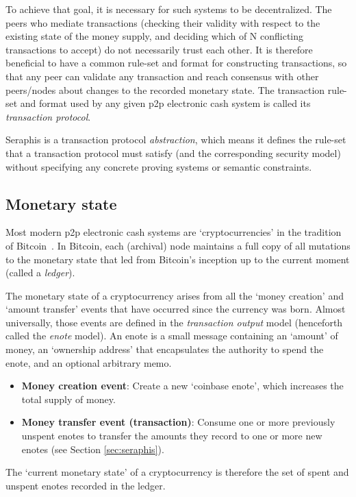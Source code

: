 To achieve that goal, it is necessary for such systems to be decentralized. The peers who mediate transactions (checking their validity with respect to the existing state of the money supply, and deciding which of N conflicting transactions to accept) do not necessarily trust each other. It is therefore beneficial to have a common rule-set and format for constructing transactions, so that any peer can validate any transaction and reach consensus with other peers/nodes about changes to the recorded monetary state. The transaction rule-set and format used by any given p2p electronic cash system is called its {\em transaction protocol}.

Seraphis is a transaction protocol {\em abstraction}, which means it defines the rule-set that a transaction protocol must satisfy (and the corresponding security model) without specifying any concrete proving systems or semantic constraints.


\subsection{Monetary state}
\label{subsec:intro-monetary-state}

Most modern p2p electronic cash systems are `cryptocurrencies' in the tradition of Bitcoin~\cite{Nakamoto_bitcoin}. In Bitcoin, each (archival) node maintains a full copy of all mutations to the monetary state that led from Bitcoin's inception up to the current moment (called a {\em ledger}).

The monetary state of a cryptocurrency arises from all the `money creation' and `amount transfer' events that have occurred since the currency was born. Almost universally, those events are defined in the {\em transaction output} model (henceforth called the {\em enote} model). An enote is a small message containing an `amount' of money, an `ownership address' that encapsulates the authority to spend the enote, and an optional arbitrary memo.

\begin{itemize}
    \item \textbf{Money creation event}: Create a new `coinbase enote', which increases the total supply of money.
    \item \textbf{Money transfer event (transaction)}: Consume one or more previously unspent enotes to transfer the amounts they record to one or more new enotes (see Section \ref{sec:seraphis}).
\end{itemize}

The `current monetary state' of a cryptocurrency is therefore the set of spent and unspent enotes recorded in the ledger.


